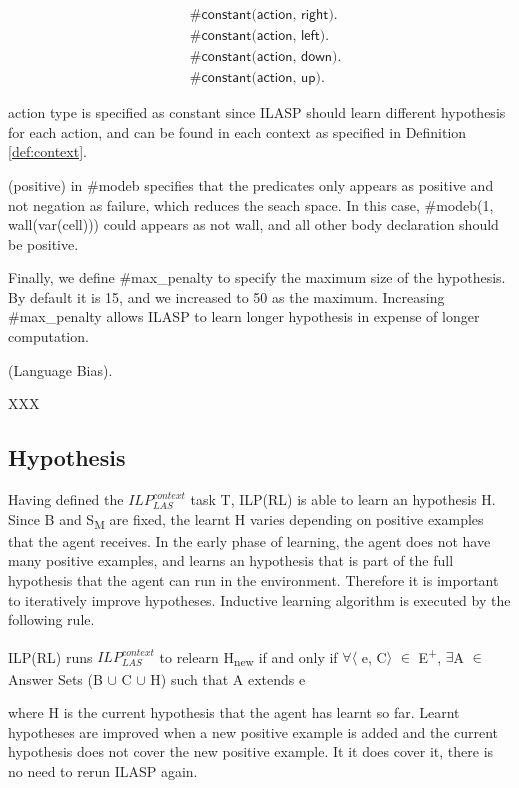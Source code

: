\begin{equation}
\begin{split}
&\textsf{\#constant(action, right).}\\
&\textsf{\#constant(action, left).}\\
&\textsf{\#constant(action, down).}\\
&\textsf{\#constant(action, up).}
\end{split}
\end{equation}

\textsf{action} type is specified as constant since ILASP should learn different hypothesis for each action, and can be found in each context as specified in Definition \ref{def:context}.

\textsf{(positive)} in \textsf{\#modeb} specifies that the predicates only appears as positive and not negation as failure, which reduces the seach space. 
In this case, \textsf{\#modeb(1, wall(var(cell)))} could appears as \textsf{not wall}, and all other body declaration should be positive. 

Finally, we define \textsf{\#max\_penalty} to specify the maximum size of the hypothesis. By default it is 15, and we increased to 50 as the maximum.
Increasing \#max\_penalty allows ILASP to learn longer hypothesis in expense of longer computation.
\begin{examp} \normalfont (Language Bias).

XXX
\end{examp}
    
\subsection{Hypothesis}
\label{sebsec:hypothesis}
Having defined the $ILP_{LAS}^{context}$ task T, ILP(RL) is able to learn an hypothesis H. 
Since B and S\textsubscript{M} are fixed, the learnt H varies depending on positive examples that the agent receives.
In the early phase of learning, the agent does not have many positive examples, and learns an hypothesis that is part of the full hypothesis that the agent can run in the environment.
Therefore it is important to iteratively improve hypotheses. Inductive learning algorithm is executed by the following rule.
\begin{defn}\label{def:ILASP_run}
ILP(RL) runs $ILP_{LAS}^{context}$ to relearn H\textsubscript{new} if and only if $\forall$$\langle$ e, C$\rangle$ $\in$ E\textsuperscript{+}, $\exists$A $\in$ Answer Sets (B $\cup$ C $\cup$ H) such that A extends e
\end{defn}
where H is the current hypothesis that the agent has learnt so far. 
Learnt hypotheses are improved when a new positive example is added and the current hypothesis does not cover the new positive example.
It it does cover it, there is no need to rerun ILASP again.

